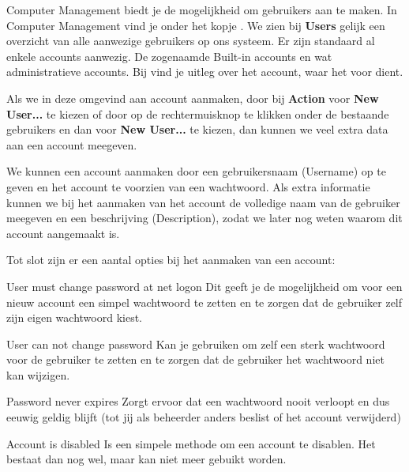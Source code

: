 Computer Management biedt je de mogelijkheid om gebruikers aan te maken. In Computer Management vind je onder  het kopje . We zien bij \textbf{Users} gelijk een overzicht van alle aanwezige gebruikers op ons systeem. Er zijn standaard al enkele accounts aanwezig. De zogenaamde Built-in accounts en wat administratieve accounts. Bij  vind je uitleg over het account, waar het voor dient.

Als we in deze omgevind aan account aanmaken, door bij \textbf{Action} voor \textbf{New User...} te kiezen of door op de rechtermuisknop te klikken onder de bestaande gebruikers en dan voor \textbf{New User...} te kiezen, dan kunnen we veel extra data aan een account meegeven.

\begin{minipage}[t]{\linewidth}
\raggedright
{}
\end{minipage}

We kunnen een account aanmaken door een gebruikersnaam (Username) op te geven en het account te voorzien van een  wachtwoord. Als extra informatie kunnen we bij het aanmaken van het account de volledige naam van de gebruiker meegeven en een beschrijving (Description), zodat we later nog weten waarom dit account aangemaakt is.

Tot slot zijn er een aantal opties bij het aanmaken van een account:
\begin{description}
\item{User must change password at net logon} Dit geeft je de mogelijkheid om voor een nieuw account een simpel wachtwoord te zetten en te zorgen dat de gebruiker zelf zijn eigen wachtwoord kiest.
\item{User can not change password} Kan je gebruiken om zelf een sterk wachtwoord voor de gebruiker te zetten en te zorgen dat de gebruiker het wachtwoord niet kan wijzigen.
\item{Password never expires} Zorgt ervoor dat een wachtwoord nooit verloopt en dus eeuwig geldig blijft (tot jij als beheerder anders beslist of het account verwijderd)
\item{Account is disabled} Is een simpele methode om een account te disablen. Het bestaat dan nog wel, maar kan niet meer gebuikt worden.
\end{description}

